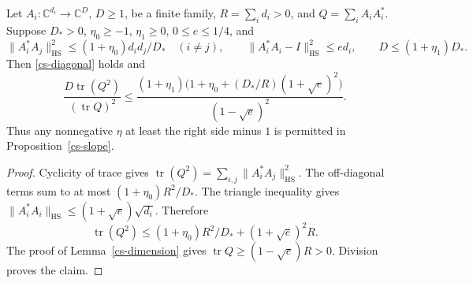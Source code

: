 \begin{lemma}\label{cs-pairwise}
Let $A_i:\mathbb C^{d_i}\to\mathbb C^D$, $D\ge1$, be a finite family,
$R=\sum_i d_i>0$, and $Q=\sum_iA_iA_i^*$.
Suppose $D_*>0$, $\eta_0\ge-1$, $\eta_1\ge0$, $0\le e\le1/4$, and
\[
 \|A_i^*A_j\|_{\mathrm{HS}}^2
       \le(1+\eta_0)d_id_j/D_*\quad(i\ne j),\qquad
 \|A_i^*A_i-I\|_{\mathrm{HS}}^2\le e d_i,
 \qquad D\le(1+\eta_1)D_*.
\]
Then \eqref{cs-diagonal} holds and
\[
 \frac{D\operatorname{tr}(Q^2)}{(\operatorname{tr}Q)^2}
 \le
 \frac{(1+\eta_1)
   \bigl(1+\eta_0+(D_*/R)(1+\sqrt e)^2\bigr)}{(1-\sqrt e)^2}.
\]
Thus any nonnegative $\eta$ at least the right side minus $1$ is
permitted in Proposition~\ref{cs-slope}.
\end{lemma}
\begin{proof}
Cyclicity of trace gives
$\operatorname{tr}(Q^2)=\sum_{i,j}\|A_i^*A_j\|_{\mathrm{HS}}^2$.
The off-diagonal terms sum to at most $(1+\eta_0)R^2/D_*$.
The triangle inequality gives
$\|A_i^*A_i\|_{\mathrm{HS}}\le(1+\sqrt e)\sqrt{d_i}$.
Therefore
\[
 \operatorname{tr}(Q^2)
 \le(1+\eta_0)R^2/D_*+(1+\sqrt e)^2R.
\]
The proof of Lemma~\ref{cs-dimension} gives
$\operatorname{tr}Q\ge(1-\sqrt e)R>0$. Division proves the claim.
\end{proof}

